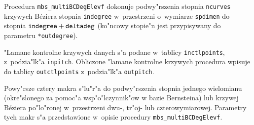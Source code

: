 \begin{sloppypar}
\hspace*{\parindent}Procedura \texttt{mbs\_multiBCDegElevf} dokonuje
podwy"rszenia stopnia
\texttt{ncurves} krzywych B\'{e}ziera stopnia \texttt{indegree}
w~przestrzeni o~wymiarze \texttt{spdimen} do stopnia
$\mathord{\mbox{\texttt{indegree}}}+\mathord{\mbox{\texttt{deltadeg}}}$
(ko"ncowy stopie"n jest przypisywany do parametru \texttt{*outdegree}).

"Lamane kontrolne krzywych danych s"a podane w~tablicy \texttt{inctlpoints},
z~podzia"lk"a \texttt{inpitch}. Obliczone "lamane kontrolne krzywych procedura
wpisuje do tab\-li\-cy \texttt{outctlpoints} z~podzia"lk"a \texttt{outpitch}.
\end{sloppypar}

\vspace{\bigskipamount}
\begin{sloppypar}
Powy"rsze cztery makra s"lu"r"a do podwy"rszenia stopnia jednego wielomianu
(okre"slonego za pomoc"a wsp"o"lczynnik"ow w bazie Bernsteina)
lub krzywej B\'{e}ziera po"lo"ronej w~przestrzeni dwu-, tr"oj- lub
czterowymiarowej. Parametry tych makr s"a przedstawione w~opisie procedury
\texttt{mbs\_multiBCDegElevf}.
\end{sloppypar}


